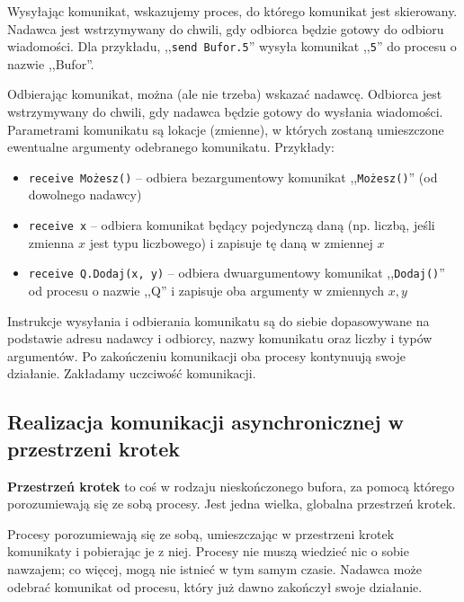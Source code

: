Wysyłając komunikat, wskazujemy proces, do którego komunikat jest skierowany. Nadawca jest wstrzymywany do chwili, gdy odbiorca będzie gotowy do odbioru wiadomości. Dla przykładu, ,,\texttt{send Bufor.5}'' wysyła komunikat ,,\texttt{5}'' do procesu o nazwie ,,Bufor''.

Odbierając komunikat, można (ale nie trzeba) wskazać nadawcę. Odbiorca jest wstrzymywany do chwili, gdy nadawca będzie gotowy do wysłania wiadomości. Parametrami komunikatu są lokacje (zmienne), w których zostaną umieszczone ewentualne argumenty odebranego komunikatu. Przykłady:
\begin{itemize}
    \item \texttt{receive Możesz()} -- odbiera bezargumentowy komunikat ,,\texttt{Możesz()}'' (od dowolnego nadawcy)
    \item \texttt{receive x} -- odbiera komunikat będący pojedynczą daną (np. liczbą, jeśli zmienna $x$ jest typu liczbowego) i zapisuje tę daną w zmiennej $x$
    \item \texttt{receive Q.Dodaj(x, y)} -- odbiera dwuargumentowy komunikat ,,\texttt{Dodaj()}'' od procesu o nazwie ,,Q'' i zapisuje oba argumenty w zmiennych $x, y$
\end{itemize}

Instrukcje wysyłania i odbierania komunikatu są do siebie dopasowywane na podstawie adresu nadawcy i odbiorcy, nazwy komunikatu oraz liczby i typów argumentów. Po zakończeniu komunikacji oba procesy kontynuują swoje działanie. Zakładamy uczciwość komunikacji.

\subsection{Realizacja komunikacji asynchronicznej w przestrzeni krotek}
\textbf{Przestrzeń krotek} to coś w rodzaju nieskończonego bufora, za pomocą którego porozumiewają się ze sobą procesy. Jest jedna wielka, globalna przestrzeń krotek. 

Procesy porozumiewają się ze sobą, umieszczając w przestrzeni krotek komunikaty i pobierając je z niej. Procesy nie muszą wiedzieć nic o sobie nawzajem; co więcej, mogą nie istnieć w tym samym czasie. Nadawca może odebrać komunikat od procesu, który już dawno zakończył swoje działanie. 


